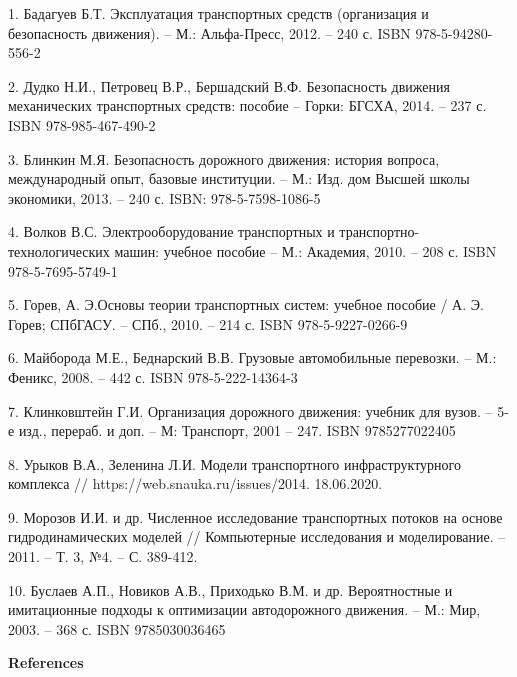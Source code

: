 \begin{noparindent}

1. Бадагуев Б.Т. Эксплуатация транспортных средств (организация и
безопасность движения). -- М.: Альфа-Пресс, 2012. -- 240 с. ISBN
978-5-94280-556-2

2. Дудко Н.И., Петровец В.Р., Бершадский В.Ф. Безопасность движения
механических транспортных средств: пособие -- Горки: БГСХА, 2014. -- 237
с. ISBN 978-985-467-490-2

3. Блинкин М.Я. Безопасность дорожного движения: история вопроса,
международный опыт, базовые институции. -- М.: Изд. дом Высшей школы
экономики, 2013. -- 240 с. ISBN: 978-5-7598-1086-5

4. Волков В.С. Электрооборудование транспортных и
транспортно-технологических машин: учебное пособие -- М.: Академия,
2010. -- 208 с. ISBN 978-5-7695-5749-1

5. Горев, А. Э.Основы теории транспортных систем: учебное пособие / А.
Э. Горев; СПбГАСУ. -- СПб., 2010. -- 214 с. ISBN 978-5-9227-0266-9

6. Майборода М.Е., Беднарский В.В. Грузовые автомобильные перевозки. --
М.: Феникс, 2008. -- 442 с. ISBN 978-5-222-14364-3

7. Клинковштейн Г.И. Организация дорожного движения: учебник для вузов.
-- 5-е изд., перераб. и доп. -- М: Транспорт, 2001 -- 247. ISBN
9785277022405

8. Урыков В.А., Зеленина Л.И. Модели транспортного инфраструктурного
комплекса // https://web.snauka.ru/issues/2014. 18.06.2020.

9. Морозов И.И. и др. Численное исследование транспортных потоков на
основе гидродинамических моделей // Компьютерные исследования и
моделирование. -- 2011. -- Т. 3, №4. -- С. 389-412.

10. Буслаев А.П., Новиков А.В., Приходько В.М. и др. Вероятностные и
имитационные подходы к оптимизации автодорожного движения. -- М.: Мир,
2003. -- 368 с. ISBN 9785030036465
\end{noparindent}

\begin{center}
  {\bfseries References}
  \end{center}

